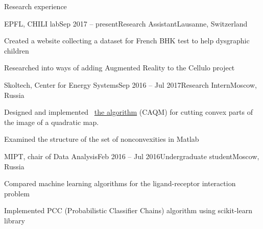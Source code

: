 \documentclass{resume} %
\begin{document}
\begin{rSection}{Research experience}
	\begin{rSubsection}{EPFL, CHILI lab}{Sep 2017 -- present}{Research Assistant}{Lausanne, Switzerland}
		\item Created a website collecting a dataset for French BHK test to help dysgraphic children
		\item Researched into ways of adding Augmented Reality to the Cellulo project
	\end{rSubsection}
	
	\begin{rSubsection}{Skoltech, Center for Energy Systems}{Sep 2016 -- Jul 2017}{Research Intern}{Moscow, Russia}
		\item Designed and implemented \faExternalLink~\href{https://github.com/sergeivolodin/CertificateCutting}{the algorithm} (CAQM) for cutting convex parts of the image of a quadratic map.
		\item Examined the structure of the set of nonconvexities in Matlab
	\end{rSubsection}
	
	\begin{rSubsection}{MIPT, chair of Data Analysis}{Feb 2016 -- Jul 2016}{Undergraduate student}{Moscow, Russia}
		\item Compared machine learning algorithms for the ligand-receptor interaction problem
		\item Implemented PCC (Probabilistic Classifier Chains) algorithm using scikit-learn library
	\end{rSubsection}
	
\end{rSection}
\end{document}

